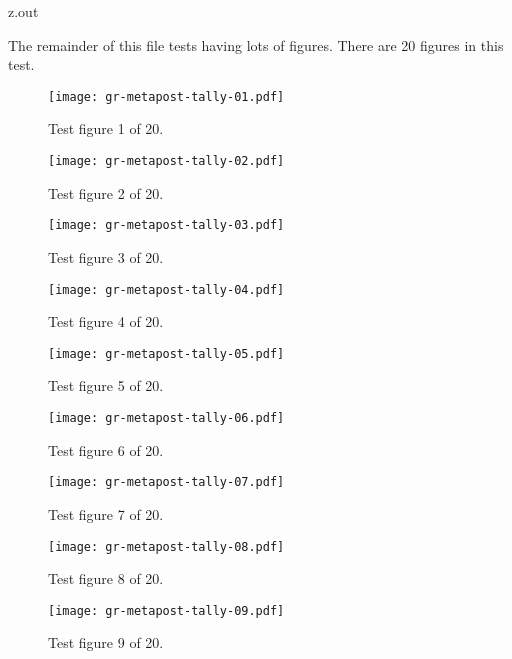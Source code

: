 \begin{VerbatimOut}{z.out}

\newpage

The remainder of this file tests having lots of figures.
There are 20 figures in this test.

\begin{figure}[ht]
  \centering
  \texttt{[image: gr-metapost-tally-01.pdf]}
  \caption{Test figure 1 of 20.}
  \label{fi:1of20}
\end{figure}

\begin{figure}[ht]
  \centering
  \texttt{[image: gr-metapost-tally-02.pdf]}
  \caption{Test figure 2 of 20.}
  \label{fi:2of20}
\end{figure}

\begin{figure}[ht]
  \centering
  \texttt{[image: gr-metapost-tally-03.pdf]}
  \caption{Test figure 3 of 20.}
  \label{fi:3of20}
\end{figure}

\begin{figure}[ht]
  \centering
  \texttt{[image: gr-metapost-tally-04.pdf]}
  \caption{Test figure 4 of 20.}
  \label{fi:4of20}
\end{figure}

\begin{figure}[ht]
  \centering
  \texttt{[image: gr-metapost-tally-05.pdf]}
  \caption{Test figure 5 of 20.}
  \label{fi:5of20}
\end{figure}

\begin{figure}[ht]
  \centering
  \texttt{[image: gr-metapost-tally-06.pdf]}
  \caption{Test figure 6 of 20.}
  \label{fi:6of20}
\end{figure}

\begin{figure}[ht]
  \centering
  \texttt{[image: gr-metapost-tally-07.pdf]}
  \caption{Test figure 7 of 20.}
  \label{fi:7of20centered7}
\end{figure}

\begin{figure}[ht]
  \centering
  \texttt{[image: gr-metapost-tally-08.pdf]}
  \caption{Test figure 8 of 20.}
  \label{fi:8of20}
\end{figure}

\begin{figure}[ht]
  \centering
  \texttt{[image: gr-metapost-tally-09.pdf]}
  \caption{Test figure 9 of 20.}
  \label{fi:9of20}
\end{figure}


\end{VerbatimOut}
